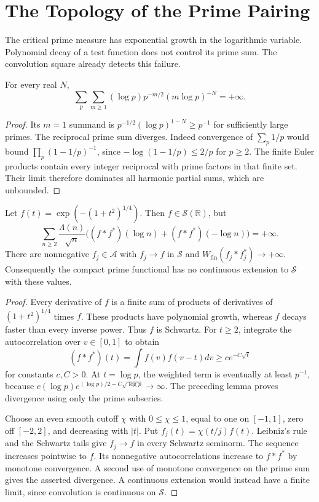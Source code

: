 \section{The Topology of the Prime Pairing}
\label{v4-arith:w6-b:union-density:closure}

The critical prime measure has exponential growth in the logarithmic
variable. Polynomial decay of a test function does not control its
prime sum. The convolution square already detects this failure.

\begin{lemma}
For every real $N$,
\[
 \sum_p\sum_{m\ge1}(\log p)p^{-m/2}(m\log p)^{-N}=+\infty.
\]
\end{lemma}
\begin{proof}
Its $m=1$ summand is $p^{-1/2}(\log p)^{1-N}\ge p^{-1}$ for
sufficiently large primes. The reciprocal prime sum diverges.
Indeed convergence of $\sum_p1/p$ would bound
$\prod_p(1-1/p)^{-1}$, since $-\log(1-1/p)\le2/p$ for $p\ge2$.
The finite Euler products contain every integer reciprocal with
prime factors in that finite set. Their limit therefore dominates
all harmonic partial sums, which are unbounded.
\end{proof}

\begin{theorem}
\label{v4-arith:top:schwartz-counterexample}
Let $f(t)=\exp(-(1+t^2)^{1/4})$.
Then $f\in\mathscr S(\mathbb R)$, but
\[
 \sum_{n\ge2}\frac{\Lambda(n)}{\sqrt n}
 \bigl((f*f^*)(\log n)+(f*f^*)(-\log n)\bigr)=+\infty.
\]
There are nonnegative $f_j\in\mathscr A$ with $f_j\to f$ in
$\mathscr S$ and $W_{\mathrm{fin}}(f_j*f_j^*)\to+\infty$.
Consequently the compact prime functional has no continuous
extension to $\mathscr S$ with these values.
\end{theorem}
\begin{proof}
Every derivative of $f$ is a finite sum of products of derivatives
of $(1+t^2)^{1/4}$ times $f$. These products have polynomial growth,
whereas $f$ decays faster than every inverse power. Thus $f$ is Schwartz.
For $t\ge2$, integrate the autocorrelation over $v\in[0,1]$ to obtain
\[
 (f*f^*)(t)=\int f(v)f(v-t)dv\ge c e^{-C\sqrt t}
\]
for constants $c,C>0$.
At $t=\log p$, the weighted term is eventually at least $p^{-1}$,
because $c(\log p)e^{(\log p)/2-C\sqrt{\log p}}\to\infty$.
The preceding lemma proves divergence using only the prime subseries.

Choose an even smooth cutoff $\chi$ with $0\le\chi\le1$, equal to
one on $[-1,1]$, zero off $[-2,2]$, and decreasing with $|t|$.
Put $f_j(t)=\chi(t/j)f(t)$.
Leibniz's rule and the Schwartz tails give $f_j\to f$ in every
Schwartz seminorm. The sequence increases pointwise to $f$.
Its nonnegative autocorrelations increase to $f*f^*$ by monotone
convergence. A second use of monotone convergence on the prime sum
gives the asserted divergence. A continuous extension would instead
have a finite limit, since convolution is continuous on $\mathscr S$.
\end{proof}

